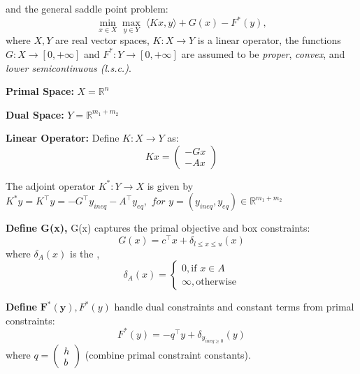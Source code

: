 \documentclass[twoside,12pt,openright]{report}  %
\begin{document}
and the general saddle point problem:
\[
\min_{x \in X} \max_{y \in Y} \; \langle Kx, y \rangle + G(x) - F^*(y),
\]
where \(X,Y\) are real vector spaces, \( K : X \to Y \) is a linear operator, the functions \( G : X \to [0, +\infty] \) and \( F^* : Y \to [0, +\infty] \) are assumed to be \emph{proper}, \emph{convex}, and \emph{lower semicontinuous (l.s.c.)}. 

\textbf{Primal Space:} \(X = \mathbb{R}^n\)

\textbf{Dual Space:} \(Y = \mathbb{R}^{m_1+m_2}\)

\textbf{Linear Operator:} Define \( K : X \to Y \) as:
\[
Kx = \begin{pmatrix}
    -Gx\\-Ax
\end{pmatrix}
\]

The adjoint operator \( K^* : Y \to X \) is given by \(K^*y=K^\top y=-G^\top y_{ineq}-A^\top y_{eq},\textit{ for } y =(y_{ineq},y_{eq})\in \mathbb{R}^{m_1+m_2} \)


\textbf{Define G(x),} G(x) captures the primal objective and box constraints:
\[
G(x) = c^\top x + \delta_{l \le x \le u}(x)
\]
where \(\delta_A(x) \) is the , 
\[
\delta_A(x) = \begin{cases}
    0, \text{if } x\in A \\
    \infty, \text{otherwise}
    
\end{cases}
\]

\textbf{Define} \( \mathbf{F^*(y)}, F^*(y)\) handle dual constraints and constant terms from primal constraints:
\[
F^*(y) = -q^\top y + \delta_{y_{ineq \ge 0}}(y)
\]
where \(q=\begin{pmatrix}
    h\\b
\end{pmatrix}\) (combine primal constraint constants).
\end{document}

